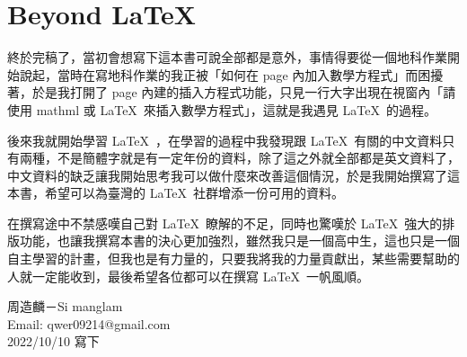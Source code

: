 \chapter{Beyond LaTeX}

終於完稿了，當初會想寫下這本書可說全部都是意外，事情得要從一個地科作業開始說起，當時在寫地科作業的我正被「如何在 page 內加入數學方程式」而困擾著，於是我打開了 page 內建的插入方程式功能，只見一行大字出現在視窗內「請使用 mathml 或 \LaTeX\ 來插入數學方程式」，這就是我遇見 \LaTeX\ 的過程。

後來我就開始學習 \LaTeX\ ，在學習的過程中我發現跟 \LaTeX\ 有關的中文資料只有兩種，不是簡體字就是有一定年份的資料，除了這之外就全部都是英文資料了，中文資料的缺乏讓我開始思考我可以做什麼來改善這個情況，於是我開始撰寫了這本書，希望可以為臺灣的 \LaTeX\ 社群增添一份可用的資料。

在撰寫途中不禁感嘆自己對 \LaTeX\ 瞭解的不足，同時也驚嘆於 \LaTeX\ 強大的排版功能，也讓我撰寫本書的決心更加強烈，雖然我只是一個高中生，這也只是一個自主學習的計畫，但我也是有力量的，只要我將我的力量貢獻出，某些需要幫助的人就一定能收到，最後希望各位都可以在撰寫 \LaTeX\ 一帆風順。

\begin{flushright}
周造麟－Si manglam\\
Email: qwer09214@gmail.com\\
2022/10/10 寫下
\end{flushright}
